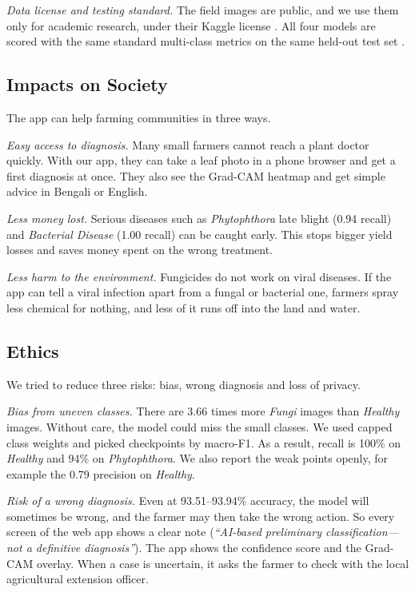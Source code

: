 \textit{Data license and testing standard.} The field images are public, and we use them only for academic research, under their Kaggle license \cite{shabrina2024novel}. All four models are scored with the same standard multi-class metrics on the same held-out test set \cite{grandini2020metrics}.

\subsection{Impacts on Society}
The app can help farming communities in three ways.

\textit{Easy access to diagnosis.} Many small farmers cannot reach a plant doctor quickly. With our app, they can take a leaf photo in a phone browser and get a first diagnosis at once. They also see the Grad-CAM heatmap and get simple advice in Bengali or English.

\textit{Less money lost.} Serious diseases such as \textit{Phytophthora} late blight (0.94 recall) and \textit{Bacterial Disease} (1.00 recall) can be caught early. This stops bigger yield losses and saves money spent on the wrong treatment.

\textit{Less harm to the environment.} Fungicides do not work on viral diseases. If the app can tell a viral infection apart from a fungal or bacterial one, farmers spray less chemical for nothing, and less of it runs off into the land and water.

\subsection{Ethics}
We tried to reduce three risks: bias, wrong diagnosis and loss of privacy.

\textit{Bias from uneven classes.} There are $3.66$ times more \textit{Fungi} images than \textit{Healthy} images. Without care, the model could miss the small classes. We used capped class weights and picked checkpoints by macro-F1. As a result, recall is 100\% on \textit{Healthy} and 94\% on \textit{Phytophthora}. We also report the weak points openly, for example the 0.79 precision on \textit{Healthy}.

\textit{Risk of a wrong diagnosis.} Even at 93.51--93.94\% accuracy, the model will sometimes be wrong, and the farmer may then take the wrong action. So every screen of the web app shows a clear note (\textit{``AI-based preliminary classification---not a definitive diagnosis''}). The app shows the confidence score and the Grad-CAM overlay. When a case is uncertain, it asks the farmer to check with the local agricultural extension officer.

